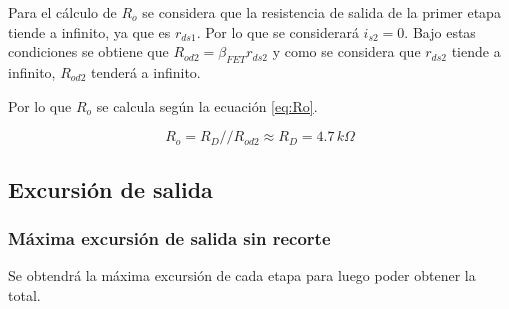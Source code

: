 \documentclass[10pt,spanish,a4paper,notitlepage]{article}
\begin{document}
Para el cálculo de $R_o$ se considera que la resistencia de salida de la primer etapa
tiende a infinito, ya que es $r_{ds1}$. Por lo que se considerará $i_{s2} = 0$.
Bajo estas condiciones se obtiene que $R_{od2} = \beta_{FET} r_{ds2}$ y como
se considera que $r_{ds2}$ tiende a infinito, $R_{od2}$ tenderá a infinito.

Por lo que $R_o$ se calcula según la ecuación \ref{eq:Ro}.

\begin{equation}
    R_o = R_D // R_{od2} \approx R_D = 4.7\,\unit{k\Omega}
    \label{eq:Ro}
\end{equation}

\subsection{Excursión de salida}

\subsubsection{Máxima excursión de salida sin recorte}

Se obtendrá la máxima excursión de cada etapa para luego poder obtener
la total.\\
\end{document}
